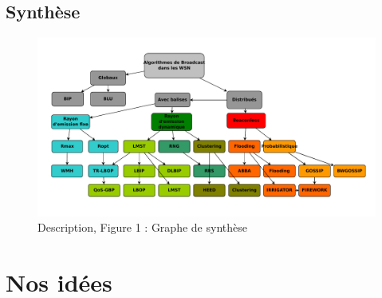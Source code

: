 \subsection{Synthèse}

\begin{figure}[H]
\centering
\includegraphics[scale=1,angle=90]{Etat_de_l'art/source/classification}
\caption{Description, Figure 1 : Graphe de synthèse}
\end{figure} 






\section{Nos idées}











